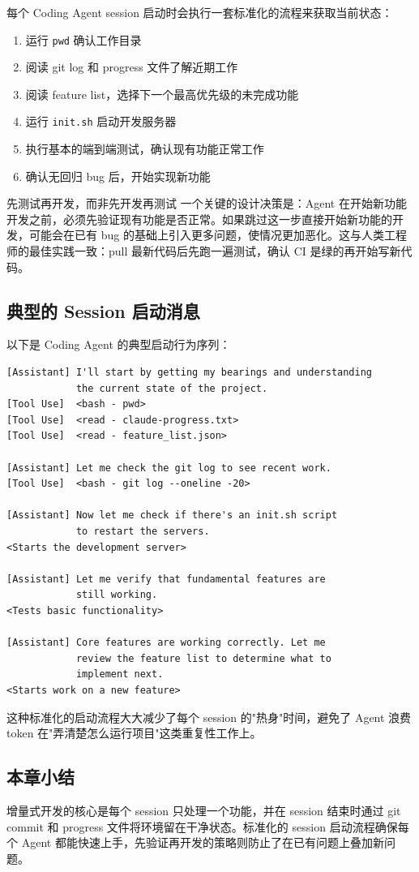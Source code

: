 每个 Coding Agent session 启动时会执行一套标准化的流程来获取当前状态：

\begin{enumerate}
    \item 运行 \texttt{pwd} 确认工作目录
    \item 阅读 git log 和 progress 文件了解近期工作
    \item 阅读 feature list，选择下一个最高优先级的未完成功能
    \item 运行 \texttt{init.sh} 启动开发服务器
    \item 执行基本的端到端测试，确认现有功能正常工作
    \item 确认无回归 bug 后，开始实现新功能
\end{enumerate}

\begin{warningbox}{先测试再开发，而非先开发再测试}
一个关键的设计决策是：Agent 在开始新功能开发之前，必须先验证现有功能是否正常。如果跳过这一步直接开始新功能的开发，可能会在已有 bug 的基础上引入更多问题，使情况更加恶化。这与人类工程师的最佳实践一致：pull 最新代码后先跑一遍测试，确认 CI 是绿的再开始写新代码。
\end{warningbox}

\subsection{典型的 Session 启动消息}

以下是 Coding Agent 的典型启动行为序列：

\begin{lstlisting}[language={}, caption={Coding Agent 典型的 session 启动流程}]
[Assistant] I'll start by getting my bearings and understanding
            the current state of the project.
[Tool Use]  <bash - pwd>
[Tool Use]  <read - claude-progress.txt>
[Tool Use]  <read - feature_list.json>

[Assistant] Let me check the git log to see recent work.
[Tool Use]  <bash - git log --oneline -20>

[Assistant] Now let me check if there's an init.sh script
            to restart the servers.
<Starts the development server>

[Assistant] Let me verify that fundamental features are
            still working.
<Tests basic functionality>

[Assistant] Core features are working correctly. Let me
            review the feature list to determine what to
            implement next.
<Starts work on a new feature>
\end{lstlisting}

这种标准化的启动流程大大减少了每个 session 的"热身"时间，避免了 Agent 浪费 token 在"弄清楚怎么运行项目"这类重复性工作上。

\subsection{本章小结}

增量式开发的核心是每个 session 只处理一个功能，并在 session 结束时通过 git commit 和 progress 文件将环境留在干净状态。标准化的 session 启动流程确保每个 Agent 都能快速上手，先验证再开发的策略则防止了在已有问题上叠加新问题。


